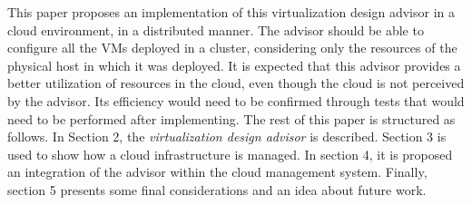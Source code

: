 This paper proposes an implementation of this virtualization design advisor in a cloud environment, in a distributed manner. The advisor should be able to configure all the VMs deployed in a cluster, considering only the resources of the physical host in which it was deployed. It is expected that this advisor provides a better utilization of resources in the cloud, even though the cloud is not perceived by the advisor. Its efficiency would need to be confirmed through tests that would need to be performed after implementing. The rest of this paper is structured as follows. In Section 2, the \textit{virtualization design advisor} is described. Section 3 is used to show how a cloud infrastructure is managed. In section 4, it is proposed an integration of the advisor within the cloud management system. Finally, section 5 presents some final considerations and an idea about future work.

